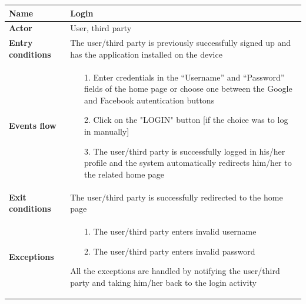 \begin{table}[]
\begin{adjustbox}{width=\textwidth}
\footnotesize
\begin{tabular}{|p{}|p{}|}
\hline
\textbf{Name}             &  Login\\ \hline
\textbf{Actor}            &  User, third party\\ \hline
\textbf{Entry conditions} &  The user/third party is previously successfully signed up and has the application installed on the device\\ \hline
\textbf{Events flow}      &
	\begin{itemize}
		\item[1.] Enter credentials in the “Username” and “Password” fields of the home page or choose one between the Google and Facebook autentication buttons
		\item[2.] Click on the "LOGIN" button [if the choice was to log in manually]
		\item[3.] The user/third party is successfully logged in his/her profile and the system automatically redirects him/her to the related home page
	\end{itemize}\\ \hline
\textbf{Exit conditions}  &  The user/third party is successfully redirected to the home page\\ \hline
\textbf{Exceptions}       &
	\begin{itemize}
		\item[1.] The user/third party enters invalid username
		\item[2.] The user/third party enters invalid password
	\end{itemize}
	All the exceptions are handled by notifying the user/third party and taking him/her back to the login 	activity\\ \hline
\end{tabular}
\end{adjustbox}
\end{table}

